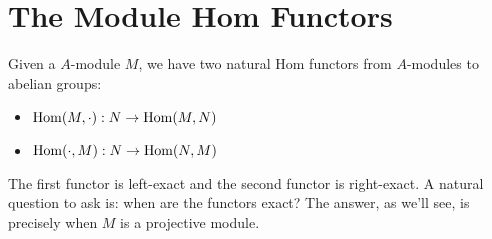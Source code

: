 \section{The Module Hom Functors}
Given a $A$-module $M$, we have two natural Hom functors from $A$-modules to abelian groups:
\begin{itemize}
    \item $\operatorname{Hom}(M, \cdot): N \rightarrow \operatorname{Hom}(M, N)$
    \item $\operatorname{Hom}(\cdot, M): N \rightarrow \operatorname{Hom}(N, M)$
\end{itemize}
The first functor is left-exact and the second functor is right-exact. A natural question to ask is: when are the functors exact? The answer, as we'll see, is precisely when $M$ is a projective module.
